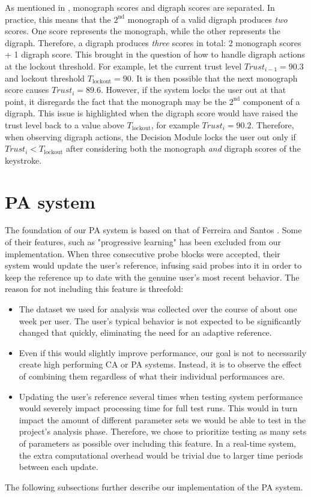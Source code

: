 As mentioned in , monograph scores and digraph scores are separated.
In practice, this means that the $2^{\text{nd}}$ monograph of a valid digraph produces \textit{two} scores.
One score represents the monograph, while the other represents the digraph.
Therefore, a digraph produces \textit{three} scores in total: 2 monograph scores + 1 digraph score. 
This brought in the question of how to handle digraph actions at the lockout threshold.
For example, let the current trust level $Trust_{i-1} = 90.3$ and lockout threshold $T_{\text{lockout}} = 90$.
It is then possible that the next monograph score causes $Trust_i = 89.6$.
However, if the system locks the user out at that point, it disregards the fact that the monograph may be the $2^{\text{nd}}$ component of a digraph.
This issue is highlighted when the digraph score would have raised the trust level back to a value above $T_{\text{lockout}}$, for example $Trust_i = 90.2$.
Therefore, when observing digraph actions, the Decision Module locks the user out only if $Trust_i < T_{\text{lockout}}$ after considering both the monograph \textit{and} digraph scores of the keystroke.

\section{PA system}
The foundation of our PA system is based on that of Ferreira and Santos \cite{superResults}.
Some of their features, such as "progressive learning" has been excluded from our implementation.
When three consecutive probe blocks were accepted, their system would update the user's reference, infusing said probes into it in order to keep the reference up to date with the genuine user's most recent behavior.
The reason for not including this feature is threefold:
\begin{itemize}
    \item The dataset we used for analysis was collected over the course of about one week per user. The user's typical behavior is not expected to be significantly changed that quickly, eliminating the need for an adaptive reference.
    \item Even if this would slightly improve performance, our goal is not to necessarily create high performing CA or PA systems. 
    Instead, it is to observe the effect of combining them regardless of what their individual performances are.
    \item Updating the user's reference several times when testing system performance would severely impact processing time for full test runs. 
    This would in turn impact the amount of different parameter sets we would be able to test in the project's analysis phase.
    Therefore, we chose to prioritize testing as many sets of parameters as possible over including this feature.
    In a real-time system, the extra computational overhead would be trivial due to larger time periods between each update.
\end{itemize}
The following subsections further describe our implementation of the PA system.


